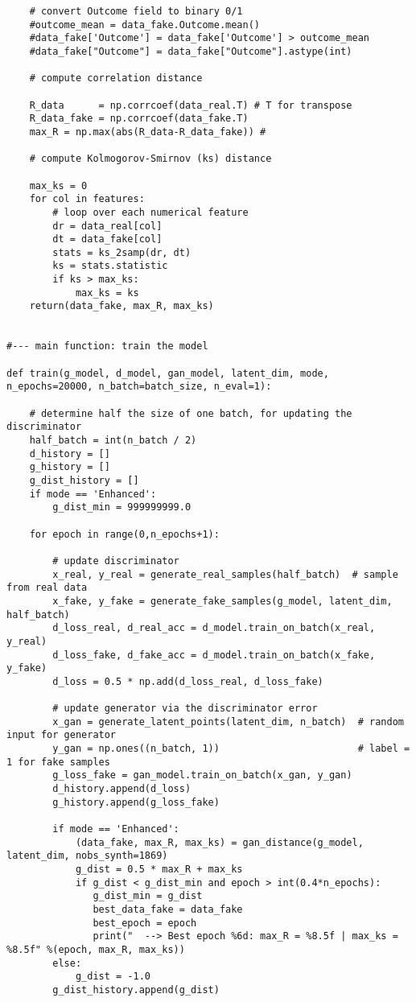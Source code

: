 \documentclass[oneside,10pt]{book}
\begin{document}
\begin{lstlisting}
    # convert Outcome field to binary 0/1
    #outcome_mean = data_fake.Outcome.mean()
    #data_fake['Outcome'] = data_fake['Outcome'] > outcome_mean
    #data_fake["Outcome"] = data_fake["Outcome"].astype(int)

    # compute correlation distance

    R_data      = np.corrcoef(data_real.T) # T for transpose
    R_data_fake = np.corrcoef(data_fake.T)
    max_R = np.max(abs(R_data-R_data_fake)) #

    # compute Kolmogorov-Smirnov (ks) distance

    max_ks = 0
    for col in features:
        # loop over each numerical feature
        dr = data_real[col]
        dt = data_fake[col]
        stats = ks_2samp(dr, dt)
        ks = stats.statistic
        if ks > max_ks:
            max_ks = ks
    return(data_fake, max_R, max_ks)


#--- main function: train the model

def train(g_model, d_model, gan_model, latent_dim, mode, n_epochs=20000, n_batch=batch_size, n_eval=1):

    # determine half the size of one batch, for updating the  discriminator
    half_batch = int(n_batch / 2)
    d_history = []
    g_history = []
    g_dist_history = []
    if mode == 'Enhanced':
        g_dist_min = 999999999.0

    for epoch in range(0,n_epochs+1):

        # update discriminator
        x_real, y_real = generate_real_samples(half_batch)  # sample from real data
        x_fake, y_fake = generate_fake_samples(g_model, latent_dim, half_batch)
        d_loss_real, d_real_acc = d_model.train_on_batch(x_real, y_real)
        d_loss_fake, d_fake_acc = d_model.train_on_batch(x_fake, y_fake)
        d_loss = 0.5 * np.add(d_loss_real, d_loss_fake)

        # update generator via the discriminator error
        x_gan = generate_latent_points(latent_dim, n_batch)  # random input for generator
        y_gan = np.ones((n_batch, 1))                        # label = 1 for fake samples
        g_loss_fake = gan_model.train_on_batch(x_gan, y_gan)
        d_history.append(d_loss)
        g_history.append(g_loss_fake)

        if mode == 'Enhanced':
            (data_fake, max_R, max_ks) = gan_distance(g_model, latent_dim, nobs_synth=1869)
            g_dist = 0.5 * max_R + max_ks
            if g_dist < g_dist_min and epoch > int(0.4*n_epochs):
               g_dist_min = g_dist
               best_data_fake = data_fake
               best_epoch = epoch
               print("  --> Best epoch %6d: max_R = %8.5f | max_ks = %8.5f" %(epoch, max_R, max_ks))
        else:
            g_dist = -1.0
        g_dist_history.append(g_dist)


\end{lstlisting}
\end{document}
